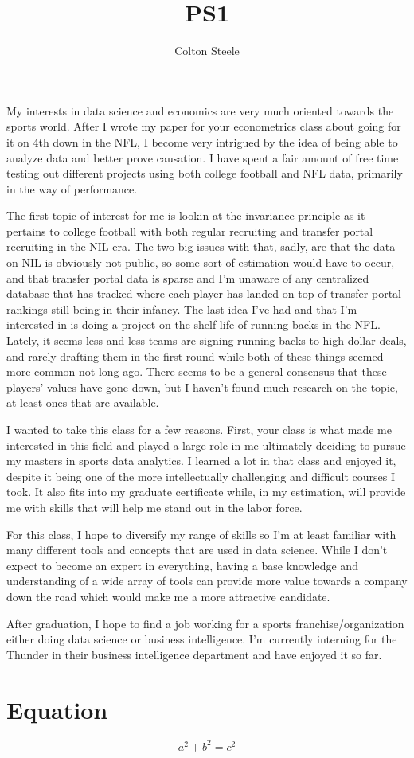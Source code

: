 \documentclass{article}
\title{PS1}
\author{Colton Steele}
\begin{document}
\maketitle

\begin{abstract}
\end{abstract}

My interests in data science and economics are very much oriented towards the sports world. After I wrote my paper for your econometrics class about going for it on 4th down in the NFL, I become very intrigued by the idea of being able to analyze data and better prove causation. I have spent a fair amount of free time testing out different projects using both college football and NFL data, primarily in the way of performance.

The first topic of interest for me is lookin at the invariance principle as it pertains to college football with both regular recruiting and transfer portal recruiting in the NIL era. The two big issues with that, sadly, are that the data on NIL is obviously not public, so some sort of estimation would have to occur, and that transfer portal data is sparse and I'm unaware of any centralized database that has tracked where each player has landed on top of transfer portal rankings still being in their infancy. The last idea I've had and that I'm interested in is doing a project on the shelf life of running backs in the NFL. Lately, it seems less and less teams are signing running backs to high dollar deals, and rarely drafting them in the first round while both of these things seemed more common not long ago. There seems to be a general consensus that these players' values have gone down, but I haven't found much research on the topic, at least ones that are available. 

I wanted to take this class for a few reasons. First, your class is what made me interested in this field and played a large role in me ultimately deciding to pursue my masters in sports data analytics. I learned a lot in that class and enjoyed it, despite it being one of the more intellectually challenging and difficult courses I took. It also fits into my graduate certificate while, in my estimation, will provide me with skills that will help me stand out in the labor force. 

For this class, I hope to diversify my range of skills so I'm at least familiar with many different tools and concepts that are used in data science. While I don't expect to become an expert in everything, having a base knowledge and understanding of a wide array of tools can provide more value towards a company down the road which would make me a more attractive candidate.

After graduation, I hope to find a job working for a sports franchise/organization either doing data science or business intelligence. I'm currently interning for the Thunder in their business intelligence department and have enjoyed it so far.




\section{Equation}

\[a^2+b^2=c^2\]
\end{document}
